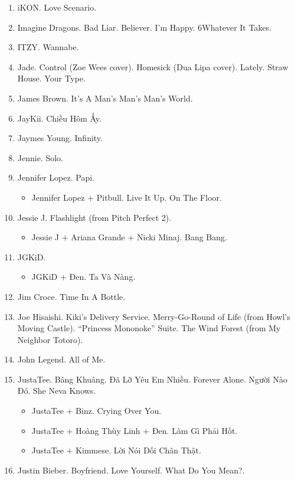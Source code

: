 \documentclass{article}
\begin{document}
\begin{enumerate}
\begin{itemize}
	\end{itemize}
	\item {\sc iKON.} Love Scenario. 
	\item {\sc Imagine Dragons.} Bad Liar. Believer. I'm Happy. 6Whatever It Takes.
	\item {\sc ITZY.} Wannabe.
	\item {\sc Jade.} Control (Zoe Wees cover). Homesick (Dua Lipa cover). Lately. Straw House. Your Type.
	\item {\sc James Brown.} It's A Man's Man's Man's World.
	\item {\sc JayKii.} Chiều Hôm Ấy.
	\item {\sc Jaymes Young.} Infinity.
	\item {\sc Jennie.} Solo.
	\item {\sc Jennifer Lopez.} Papi.
	\begin{itemize}
		\item {\sc Jennifer Lopez $+$ Pitbull.} Live It Up. On The Floor.
	\end{itemize}
	\item {\sc Jessie J.} Flashlight (from Pitch Perfect 2).
	\begin{itemize}
		\item {\sc Jessie J $+$ Ariana Grande $+$ Nicki Minaj.} Bang Bang.
	\end{itemize}
	\item {\sc JGKiD.}
	\begin{itemize}
		\item {\sc JGKiD $+$ Đen.} Ta Và Nàng.
	\end{itemize}
	\item {\sc Jim Croce.} Time In A Bottle.
	\item {\sc Joe Hisaishi.} Kiki's Delivery Service. Merry-Go-Round of Life (from Howl's Moving Castle). ``Princess Mononoke'' Suite. The Wind Forest (from My Neighbor Totoro).
	\item {\sc John Legend.} All of Me.
	\item {\sc JustaTee.} Bâng Khuâng. Đã Lỡ Yêu Em Nhiều. Forever Alone. Người Nào Đó. She Neva Knows.
	\begin{itemize}
		\item {\sc JustaTee $+$ Binz.} Crying Over You.
		\item {\sc JustaTee $+$ Hoàng Thùy Linh $+$ Đen.} Làm Gì Phải Hốt.
		\item {\sc JustaTee $+$ Kimmese.} Lời Nói Dối Chân Thật.
	\end{itemize}
	\item {\sc Justin Bieber.} Boyfriend. Love Yourself. What Do You Mean?.

\end{enumerate}
\end{document}
